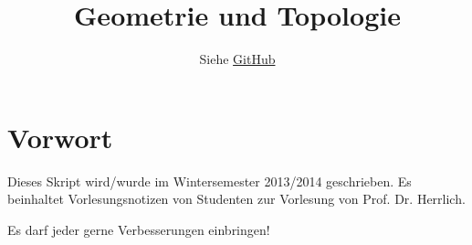 \documentclass[a4paper,oneside,DIV15,BCOR12mm]{scrbook}
\author{Siehe \href{https://github.com/MartinThoma/LaTeX-examples/tree/master/documents}{GitHub}}
\title{Geometrie und Topologie}
\begin{document}
\maketitle

\renewcommand{\thechapter}{\Roman{chapter}}
\tableofcontents

\chapter*{Vorwort}
Dieses Skript wird/wurde im Wintersemester 2013/2014 geschrieben.
Es beinhaltet Vorlesungsnotizen von Studenten zur Vorlesung von
Prof. Dr. Herrlich.

Es darf jeder gerne Verbesserungen einbringen!


\appendix
 

\renewcommand{\indexname}{Stichwortverzeichnis}
\printindex
\end{document}
